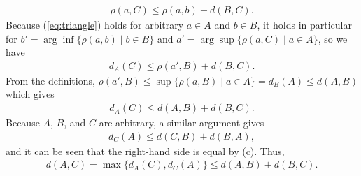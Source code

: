 \documentclass[a4paper,12pt]{article}
\begin{document}
\begin{enumerate}
\begin{enumerate}
\begin{align}
                    \rho(a, C) \leq \rho(a, b) + d(B, C).
                \end{align}
                Because (\ref{eq:triangle}) holds for arbitrary $a \in A$ and $b \in B$, it holds in particular for $b' = \arg\inf\{ \rho(a, b) \mid b \in B \}$ and $a' = \arg\sup\{ \rho(a, C) \mid a \in A \}$, so we have
                \begin{align*}
                    d_A(C) \leq \rho(a', B) + d(B, C).
                \end{align*}
                From the definitions, $\rho(a', B) \leq \sup\{ \rho(a, B) \mid a \in A \} = d_B(A) \leq d(A, B)$ which gives
                \begin{align*}
                    d_A(C) \leq d(A, B) + d(B, C).
                \end{align*}
                Because $A$, $B$, and $C$ are arbitrary, a similar argument gives
                \begin{align*}
                    d_C(A) \leq d(C, B) + d(B, A),
                \end{align*}
                and it can be seen that the right-hand side is equal by (c). Thus,
                \begin{align*}
                    d(A, C) = \max\{ d_A(C), d_C(A) \} \leq d(A, B) + d(B, C).
                \end{align*}
        \end{enumerate}
\end{enumerate}
\end{document}

